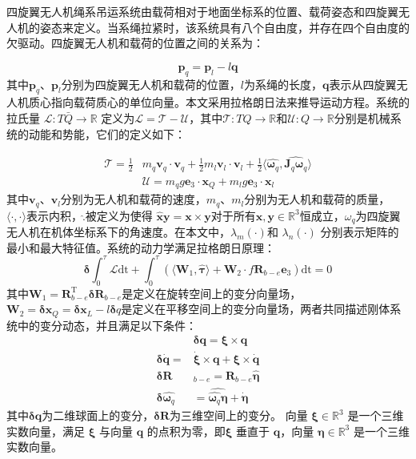 \documentclass[lang=chs, degree=master, blindreview=true, winfonts=true]{yanputhesis}
\begin{document}
四旋翼无人机绳系吊运系统由载荷相对于地面坐标系的位置、载荷姿态和四旋翼无人机的姿态来定义。当系绳拉紧时，该系统具有八个自由度，并存在四个自由度的欠驱动。四旋翼无人机和载荷的位置之间的关系为：

\begin{equation}
	\bm p_q=\bm p_l-l\bm q
\end{equation}
其中$\bm p_q$、$\bm p_l$分别为四旋翼无人机和载荷的位置，$l$为系绳的长度，$\bm q$表示从四旋翼无人机质心指向载荷质心的单位向量。本文采用拉格朗日法来推导运动方程。系统的拉氏量 $\mathcal{L}:T\bar{Q}\to\mathbb{R}$ 定义为$\mathcal{L}=\mathcal{T}-\mathcal{U}$，其中$\mathcal{T}:TQ\to\mathbb{R}$和${\mathcal{U}}:Q\to\mathbb{R}$分别是机械系统的动能和势能，它们的定义如下：

\begin{equation}
\begin{aligned}
	\mathcal{T}=\frac{1}{2}&m_{q}\bm v_{q}\cdot \bm v_{q}+\frac{1}{2}m_{l}\bm v_{l}\cdot \bm v_{l}+\frac{1}{2}\langle\hat{\bm  \omega_q},\widehat{\bm J_{q}\bm  \omega_q}\rangle\\
	&\mathcal{U}=m_{q}g\bm e_{3}\cdot \bm x_{Q}+m_{l}g\bm e_{3}\cdot \bm x_{l}
\end{aligned}
	\label{2-9}
\end{equation}
其中$\bm v_q$、$\bm v_l$分别为无人机和载荷的速度，$m_q$、$m_l$分别为无人机和载荷的质量，$\langle\cdot,\cdot\rangle $表示内积，$\hat{.}$被定义为使得 $\hat{\bm x}\bm y=\bm x\times \bm y$对于所有$\bm x,\bm y\in\mathbb{R}^3$恒成立，$\omega_q$为四旋翼无人机在机体坐标系下的角速度。在本文中，$\lambda_m(\cdot)$和 $\lambda_n(\cdot)$ 分别表示矩阵的最小和最大特征值。系统的动力学满足拉格朗日原理：
\begin{equation}
	\bm \delta\int_0^\tau\mathcal{L} \text{dt}+\int_0^\tau\left(\langle \bm W_1,\hat{\bm \tau}\rangle+\bm W_2\cdot f\bm{R}_{b-e}\bm e_3\right) \text{dt}=0
	\label{2-10}
\end{equation}
其中$\bm W_{1}=\bm R_{b-e}^\mathrm{T}\bm \delta \bm R_{b-e}$是定义在旋转空间上的变分向量场， $ \bm W_{2}=\bm \delta \bm x_{Q}=\bm \delta \bm x_{L}-l\bm \delta q$是定义在平移空间上的变分向量场，两者共同描述刚体系统中的变分动态，并且满足以下条件：
\begin{equation}
	\begin{aligned}
	&\bm \delta \bm q = \bm \xi \times \bm q\\
	\bm \delta \dot{\bm q} = &\dot{\bm \xi} \times \bm q + \bm \xi \times \dot{\bm q} \\
	\bm \delta\bm  R&_{b-e} = \bm R_{b-e} \hat{\bm \eta} \\
	\bm \delta \hat{\bm  \omega _q}& = \widehat{\hat{\bm  \omega_q} \bm \eta} + \hat{\dot{\bm \eta}}
\end{aligned}
\end{equation}
其中$\bm \delta \bm q$为二维球面上的变分，$\bm \delta \bm R$为三维空间上的变分。
向量 $\bm{\xi} \in \mathbb{R}^3$ 是一个三维实数向量，满足 $\bm{\xi}$ 与向量 $\bm{q}$ 的点积为零，即$\bm{\xi}$ 垂直于 $\bm{q}$，向量 $\bm{\eta} \in \mathbb{R}^3$ 是一个三维实数向量。
\end{document}
